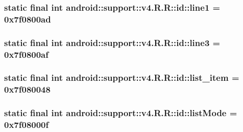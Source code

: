\hypertarget{classandroid_1_1support_1_1v4_1_1_r_1_1id_f040cce627ceab9858bb65ec364629c6}{
\subsubsection[{line1}]{\setlength{\rightskip}{0pt plus 5cm}static final int android::support::v4.R.R::id::line1 = 0x7f0800ad}}
\label{classandroid_1_1support_1_1v4_1_1_r_1_1id_f040cce627ceab9858bb65ec364629c6}


\hypertarget{classandroid_1_1support_1_1v4_1_1_r_1_1id_0fc02efc0fcae9c312e1fa5989e0d631}{
\subsubsection[{line3}]{\setlength{\rightskip}{0pt plus 5cm}static final int android::support::v4.R.R::id::line3 = 0x7f0800af}}
\label{classandroid_1_1support_1_1v4_1_1_r_1_1id_0fc02efc0fcae9c312e1fa5989e0d631}


\hypertarget{classandroid_1_1support_1_1v4_1_1_r_1_1id_609bfd2b5efcfd22b8593b55b2cc9d20}{
\subsubsection[{list\_\-item}]{\setlength{\rightskip}{0pt plus 5cm}static final int android::support::v4.R.R::id::list\_\-item = 0x7f080048}}
\label{classandroid_1_1support_1_1v4_1_1_r_1_1id_609bfd2b5efcfd22b8593b55b2cc9d20}


\hypertarget{classandroid_1_1support_1_1v4_1_1_r_1_1id_0825e55467393d83dd6ddb11b0f73679}{
\subsubsection[{listMode}]{\setlength{\rightskip}{0pt plus 5cm}static final int android::support::v4.R.R::id::listMode = 0x7f08000f}}
\label{classandroid_1_1support_1_1v4_1_1_r_1_1id_0825e55467393d83dd6ddb11b0f73679}


